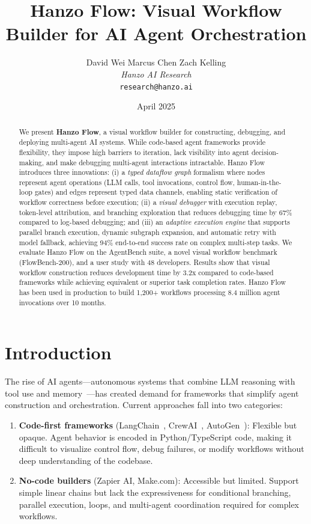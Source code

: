 \documentclass[11pt,twocolumn]{article}
\title{Hanzo Flow: Visual Workflow Builder for AI Agent Orchestration}
\author{
    David Wei \quad
    Marcus Chen \quad
    Zach Kelling \\
    \textit{Hanzo AI Research} \\
    \texttt{research@hanzo.ai}
}
\date{April 2025}
\begin{document}
\luxcoverpage
\maketitle

\begin{abstract}
We present \textbf{Hanzo Flow}, a visual workflow builder for constructing, debugging, and deploying multi-agent AI systems. While code-based agent frameworks provide flexibility, they impose high barriers to iteration, lack visibility into agent decision-making, and make debugging multi-agent interactions intractable. Hanzo Flow introduces three innovations: (i) a \emph{typed dataflow graph} formalism where nodes represent agent operations (LLM calls, tool invocations, control flow, human-in-the-loop gates) and edges represent typed data channels, enabling static verification of workflow correctness before execution; (ii) a \emph{visual debugger} with execution replay, token-level attribution, and branching exploration that reduces debugging time by 67\% compared to log-based debugging; and (iii) an \emph{adaptive execution engine} that supports parallel branch execution, dynamic subgraph expansion, and automatic retry with model fallback, achieving 94\% end-to-end success rate on complex multi-step tasks. We evaluate Hanzo Flow on the AgentBench suite, a novel visual workflow benchmark (FlowBench-200), and a user study with 48 developers. Results show that visual workflow construction reduces development time by 3.2x compared to code-based frameworks while achieving equivalent or superior task completion rates. Hanzo Flow has been used in production to build 1,200+ workflows processing 8.4 million agent invocations over 10 months.
\end{abstract}

\section{Introduction}
\label{sec:intro}

The rise of AI agents---autonomous systems that combine LLM reasoning with tool use and memory~\cite{wang2024survey,xi2023rise}---has created demand for frameworks that simplify agent construction and orchestration. Current approaches fall into two categories:

\begin{enumerate}[leftmargin=1.4em]
    \item \textbf{Code-first frameworks} (LangChain~\cite{langchain2023}, CrewAI~\cite{crewai2024}, AutoGen~\cite{wu2023autogen}): Flexible but opaque. Agent behavior is encoded in Python/TypeScript code, making it difficult to visualize control flow, debug failures, or modify workflows without deep understanding of the codebase.
    \item \textbf{No-code builders} (Zapier AI, Make.com): Accessible but limited. Support simple linear chains but lack the expressiveness for conditional branching, parallel execution, loops, and multi-agent coordination required for complex workflows.
\end{enumerate}
\end{document}
